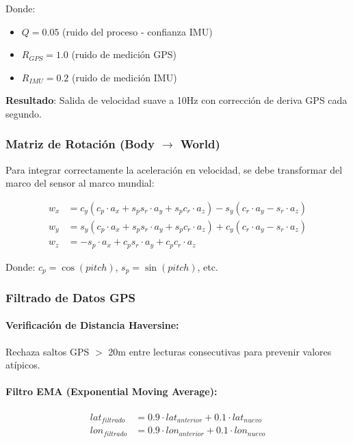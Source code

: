 \documentclass[11pt,a4paper]{article}
\begin{document}
Donde:
\begin{itemize}
    \item $Q = 0.05$ (ruido del proceso - confianza IMU)
    \item $R_{GPS} = 1.0$ (ruido de medición GPS)
    \item $R_{IMU} = 0.2$ (ruido de medición IMU)
\end{itemize}

\textbf{Resultado}: Salida de velocidad suave a 10Hz con corrección de deriva GPS cada segundo.

\subsubsection{Matriz de Rotación (Body $\rightarrow$ World)}

Para integrar correctamente la aceleración en velocidad, se debe transformar del marco del sensor al marco mundial:

\begin{align}
w_x &= c_y(c_p \cdot a_x + s_p s_r \cdot a_y + s_p c_r \cdot a_z) - s_y(c_r \cdot a_y - s_r \cdot a_z) \\
w_y &= s_y(c_p \cdot a_x + s_p s_r \cdot a_y + s_p c_r \cdot a_z) + c_y(c_r \cdot a_y - s_r \cdot a_z) \\
w_z &= -s_p \cdot a_x + c_p s_r \cdot a_y + c_p c_r \cdot a_z
\end{align}

Donde: $c_p = \cos(pitch)$, $s_p = \sin(pitch)$, etc.

\subsubsection{Filtrado de Datos GPS}

\paragraph{Verificación de Distancia Haversine:}
Rechaza saltos GPS $>$ 20m entre lecturas consecutivas para prevenir valores atípicos.

\paragraph{Filtro EMA (Exponential Moving Average):}
\begin{align}
lat_{filtrado} &= 0.9 \cdot lat_{anterior} + 0.1 \cdot lat_{nuevo} \\
lon_{filtrado} &= 0.9 \cdot lon_{anterior} + 0.1 \cdot lon_{nuevo}
\end{align}
\end{document}
